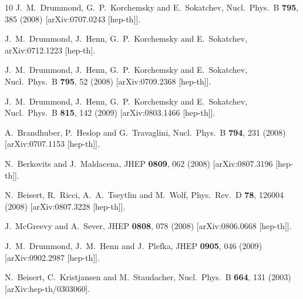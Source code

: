 \documentclass[12pt]{article}
\begin{document}
\begin{thebibliography}{10}
 J.~M.~Drummond, G.~P.~Korchemsky and E.~Sokatchev,
  Nucl.\ Phys.\  B {\bf 795}, 385 (2008)
  [arXiv:0707.0243 [hep-th]].

 J.~M.~Drummond, J.~Henn, G.~P.~Korchemsky and E.~Sokatchev,
  arXiv:0712.1223 [hep-th].

 J.~M.~Drummond, J.~Henn, G.~P.~Korchemsky and E.~Sokatchev,
  Nucl.\ Phys.\  B {\bf 795}, 52 (2008)
  [arXiv:0709.2368 [hep-th]].

 J.~M.~Drummond, J.~Henn, G.~P.~Korchemsky and E.~Sokatchev,
  Nucl.\ Phys.\  B {\bf 815}, 142 (2009)
  [arXiv:0803.1466 [hep-th]].


  A.~Brandhuber, P.~Heslop and G.~Travaglini,
  Nucl.\ Phys.\  B {\bf 794}, 231 (2008)
  [arXiv:0707.1153 [hep-th]].

  N.~Berkovits and J.~Maldacena,
  JHEP {\bf 0809}, 062 (2008)
  [arXiv:0807.3196 [hep-th]].

  N.~Beisert, R.~Ricci, A.~A.~Tseytlin and M.~Wolf,
  Phys.\ Rev.\  D {\bf 78}, 126004 (2008)
  [arXiv:0807.3228 [hep-th]].

  J.~McGreevy and A.~Sever,
  JHEP {\bf 0808}, 078 (2008)
  [arXiv:0806.0668 [hep-th]].

  J.~M.~Drummond, J.~M.~Henn and J.~Plefka,
  JHEP {\bf 0905}, 046 (2009)
  [arXiv:0902.2987 [hep-th]].

  N.~Beisert, C.~Kristjansen and M.~Staudacher,
  Nucl.\ Phys.\  B {\bf 664}, 131 (2003)
  [arXiv:hep-th/0303060].


\end{thebibliography}
\end{document}
